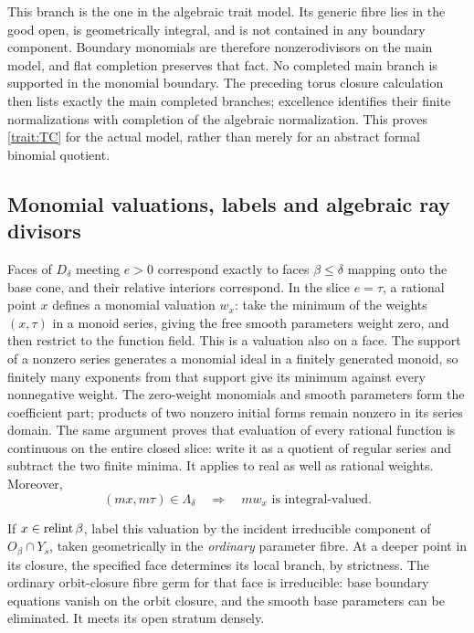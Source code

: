This branch is the one in the algebraic trait model.  Its generic
fibre lies in the good open, is geometrically integral, and is not
contained in any boundary component.  Boundary monomials are
therefore nonzerodivisors on the main model, and flat completion
preserves that fact.  No completed main branch is supported in
the monomial boundary.  The preceding torus closure calculation
then lists exactly the main completed branches; excellence
identifies their finite normalizations with completion of the
algebraic normalization.  This proves \eqref{trait:TC} for the
actual model, rather than merely for an abstract formal binomial
quotient.

\subsection{Monomial valuations, labels and algebraic ray divisors}

Faces of \(D_\delta\) meeting \(e>0\) correspond exactly to faces
\(\beta\le\delta\) mapping onto the base cone, and their relative
interiors correspond.  In the slice \(e=\tau\), a rational point
\(x\) defines a monomial valuation \(w_x\): take the minimum of
the weights \((x,\tau)\) in a monoid series, giving the free smooth
parameters weight zero, and then restrict to the function field.
This is a valuation also on a face.  The support of a nonzero
series generates a monomial ideal in a finitely generated monoid,
so finitely many exponents from that support give its minimum
against every nonnegative weight.  The zero-weight monomials and
smooth parameters form the coefficient part; products of two
nonzero initial forms remain nonzero in its series domain.  The
same argument proves that evaluation of every rational function
is continuous on the entire closed slice: write it as a quotient
of regular series and subtract the two finite minima.  It applies
to real as well as rational weights.  Moreover,
\begin{equation}
 (mx,m\tau)\in\Lambda_\delta
 \quad\Longrightarrow\quad mw_x\text{ is integral-valued}.
 \label{trait:integral-weight}
\end{equation}

If \(x\in\operatorname{relint}\beta\), label this valuation by the incident
irreducible component of \(O_\beta\cap Y_s\), taken geometrically
in the \emph{ordinary} parameter fibre.  At a deeper point in its
closure, the specified face determines its local branch, by
strictness.  The ordinary orbit-closure fibre germ for that face
is irreducible: base boundary equations vanish on the orbit
closure, and the smooth base parameters can be eliminated.  It
meets its open stratum densely.

